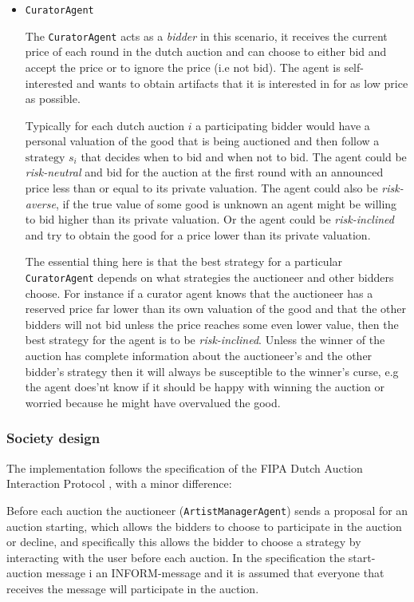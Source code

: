 \documentclass[a4paper, 11pt]{article}
\begin{document}
\begin{itemize}
\item \texttt{CuratorAgent}

The \texttt{CuratorAgent} acts as a \textit{bidder} in this scenario, it receives the current price of each round in the dutch auction and can choose to either bid and accept the price or to ignore the price (i.e not bid). The agent is self-interested and wants to obtain artifacts that it is interested in for as low price as possible. 

Typically for each dutch auction $i$ a participating bidder would have a personal valuation of the good that is being auctioned and then follow a $\text{strategy }s_i$ that decides when to bid and when not to bid. The agent could be \textit{risk-neutral} and bid for the auction at the first round with an announced price less than or equal to its private valuation. The agent could also be \textit{risk-averse}, if the true value of some good is unknown an agent might be willing to bid higher than its private valuation. Or the agent could be \textit{risk-inclined} and try to obtain the good for a price lower than its private valuation. 

The essential thing here is that the best strategy for a particular \texttt{CuratorAgent} depends on what strategies the auctioneer and other bidders choose. For instance if a curator agent knows that the auctioneer has a reserved price far lower than its own valuation of the good and that the other bidders will not bid unless the price reaches some even lower value, then the best strategy for the agent is to be \textit{risk-inclined}. Unless the winner of the auction has complete information about the auctioneer's and the other bidder's strategy then it will always be susceptible to the winner's curse, e.g the agent does'nt know if it should be happy with winning the auction or worried because he might have overvalued the good.

\end{itemize}
\subsubsection*{Society design}
The implementation follows the specification of the FIPA Dutch Auction Interaction Protocol \citep{fipa_dutch}, with a minor difference: 

Before each auction the auctioneer (\texttt{ArtistManagerAgent}) sends a proposal for an auction starting, which allows the bidders to choose to participate in the auction or decline, and specifically this allows the bidder to choose a strategy by interacting with the user before each auction. In the specification the start-auction message i an INFORM-message and it is assumed that everyone that receives the message will participate in the auction.
\end{document}
